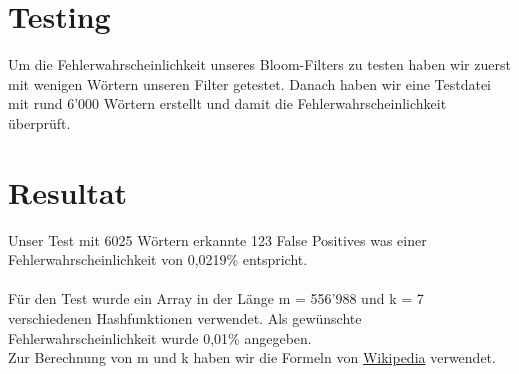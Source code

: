 \documentclass{article}
\begin{document}
\section{Testing}
Um die Fehlerwahrscheinlichkeit unseres Bloom-Filters zu testen haben wir zuerst mit wenigen Wörtern unseren Filter getestet. Danach haben wir eine Testdatei mit rund 6'000 Wörtern erstellt und damit die Fehlerwahrscheinlichkeit überprüft.

\section{Resultat}
Unser Test mit 6025 Wörtern erkannte 123 False Positives was einer Fehlerwahrscheinlichkeit von 0,0219\% entspricht.
\\
\\
Für den Test wurde ein Array in der Länge {m} = 556'988 und {k} = 7 verschiedenen Hashfunktionen verwendet. Als gewünschte Fehlerwahrscheinlichkeit wurde 0,01\% angegeben.
\\
Zur Berechnung von {m} und {k} haben wir die Formeln von
\href{https://en.wikipedia.org/wiki/Bloom_filter}{Wikipedia}
verwendet.

\pagebreak



\end{document}
